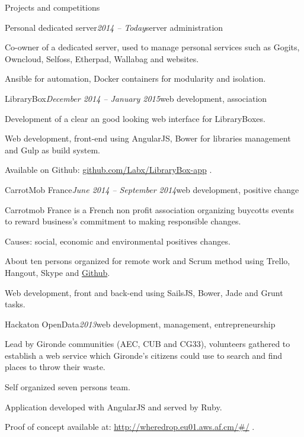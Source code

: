 \begin{rSection}{Projects and competitions}

  \begin{rSubsection}{Personal dedicated server}{\em 2014 -- Today}{server administration}{}
    \item[] Co-owner of a dedicated server, used to manage personal services such as Gogits, Owncloud, Selfoss, Etherpad, Wallabag and websites.
    \item Ansible for automation, Docker containers for modularity and isolation.
  \end{rSubsection}

  \begin{rSubsection}{LibraryBox}{\em December 2014 -- January 2015}{web development, association}{}
    \item[] Development of a clear an good looking web interface for LibraryBoxes.
    \item Web development, front-end using AngularJS, Bower for libraries management and Gulp as build system.
    \item Available on Github: \href{https://github.com/Labx/LibraryBox-app}{github.com/Labx/LibraryBox-app} .
  \end{rSubsection}

  \begin{rSubsection}{CarrotMob France}{\em June 2014 -- September 2014}{web development, positive change}{}
    \item[] Carrotmob France is a French non profit association organizing buycotts events to reward business's commitment to making responsible changes.
    \item Causes: social, economic and environmental positives changes.
    \item About ten persons organized for remote work and Scrum method using Trello, Hangout, Skype and \href{https://github.com/carrotcommunity/carrotmobfrance}{Github}.
    \item Web development, front and back-end using SailsJS, Bower, Jade and Grunt tasks.
  \end{rSubsection}

  \begin{rSubsection}{Hackaton OpenData}{\em 2013}{web development, management, entrepreneurship}{}
    \item[] Lead by Gironde communities (AEC, CUB and CG33), volunteers gathered to establish a web service which Gironde's citizens could use to search and find places to throw their waste.
    \item Self organized seven persons team.
    \item Application developed with AngularJS and served by Ruby.
    \item Proof of concept available at: \href{http://wheredrop.eu01.aws.af.cm/#/}{http://wheredrop.eu01.aws.af.cm/\#/} .
  \end{rSubsection}


\end{rSection}
